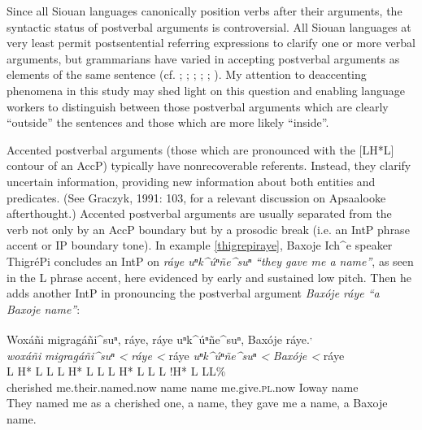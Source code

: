 \documentclass[output=paper]{LSP/langsci}
\begin{document}
Since all Siouan languages canonically position verbs after their arguments, the syntactic status of postverbal arguments is controversial. All Siouan languages at very least permit postsentential referring expressions to clarify one or more verbal arguments, but grammarians have varied in accepting postverbal arguments as elements of the same sentence (cf. \citealt{Rudin1998}; \citealt{Mithun1999}; \citealt[76]{Ingham2003}; \citealt[421]{Cumberland2005}; \citealt[292-3]{Boyle2007}; \citealt{Gordon2008}). My attention to deaccenting phenomena in this study may shed light on this question and enabling language workers to distinguish between those postverbal arguments which are clearly “outside” the sentences and those which are more likely “inside”.

Accented postverbal arguments (those which are pronounced with the [LH*L] contour of an AccP) typically have nonrecoverable referents. Instead, they clarify uncertain information, providing new information about both entities and predicates. (See Graczyk, 1991: 103, for a relevant discussion on Apsaalooke afterthought.) Accented postverbal arguments are usually separated from the verb not only by an AccP boundary but by a prosodic break (i.e. an IntP phrase accent or IP boundary tone). In example \ref{thigrepiraye}, Baxoje Ich\^{}e speaker ThigréPi concludes an IntP on \emph{ráye uⁿk\^{}úⁿñe\^{}suⁿ “they gave me a name”}, as seen in the L phrase accent, here evidenced by early and sustained low pitch. Then he adds another IntP in pronouncing the postverbal argument \emph{Baxóje ráye “a Baxoje name”}:

\ea\label{thigrepiraye}
Woxáñi migragáñi\^{}suⁿ, ráye, ráye uⁿk\^{}úⁿñe\^{}suⁿ, Baxóje ráye.\footnotemark\textsuperscript{,} \footnotemark\\
\glll	\emph{woxáñi} 	\emph{migragáñi\^{}suⁿ <}		\emph{ráye <}	ráye		\emph{uⁿk\^{}úⁿñe\^{}suⁿ <}	\emph{Baxóje <}		ráye\\
	{\ob L H* L}		{L\cb}	{\ob L H* L L\cb}	{\ob L H* L}	{L\cb}	{\ob L !H* L} 		{L\cb{}L\%}\\
	cherished	me.their.named.now	name		name	me.give.\textsc{pl}.now	Ioway			name\\
\glt	They named me as a cherished one, a name, they gave me a name, a Baxoje name.
\z
\end{document}
